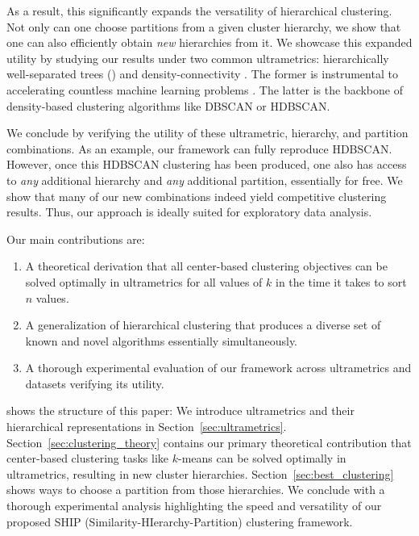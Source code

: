 As a result, this significantly expands the versatility of hierarchical clustering. Not only can one choose partitions from a given cluster hierarchy, we show that one can also efficiently obtain \emph{new} hierarchies from it. We showcase this expanded utility by studying our results under two common ultrametrics: hierarchically well-separated trees (\citealp{hst_1}) and density-connectivity \citep{beer2023connecting}. The former is instrumental to accelerating countless machine learning problems \citep{kd_tree_nn_search_1, fast_emst, tsne_fast}. The latter is the backbone of density-based clustering algorithms like DBSCAN or HDBSCAN.

We conclude by verifying the utility of these ultrametric, hierarchy, and partition combinations. As an example, our framework can fully reproduce HDBSCAN. However, once this HDBSCAN clustering has been produced, one also has access to \emph{any} additional hierarchy and \emph{any} additional partition, essentially for free. We show that many of our new combinations indeed yield competitive clustering results. Thus, our approach is ideally suited for exploratory data analysis. 
\newpage

Our main contributions are: 
\begin{enumerate}[topsep=0pt,itemsep=-1ex,partopsep=1ex,parsep=1ex]
    \item A theoretical derivation that all center-based clustering objectives can be solved optimally in ultrametrics for all values of $k$ in the time it takes to sort $n$ values.
    \item A generalization of hierarchical clustering that produces a diverse set of known and novel algorithms essentially simultaneously.
    \item A thorough experimental evaluation of our framework across ultrametrics and datasets verifying its utility. 
\end{enumerate}

 shows the structure of this paper: We introduce ultrametrics and their hierarchical representations in Section~\ref{sec:ultrametrics}. 
Section~\ref{sec:clustering_theory} contains our primary theoretical contribution that center-based clustering tasks like $k$-means can be solved optimally in ultrametrics, resulting in new cluster hierarchies.
Section~\ref{sec:best_clustering} shows ways to choose a partition from those hierarchies. 
We conclude with a thorough experimental analysis highlighting the speed and versatility of our proposed SHIP (Similarity-HIerarchy-Partition) clustering framework.%

